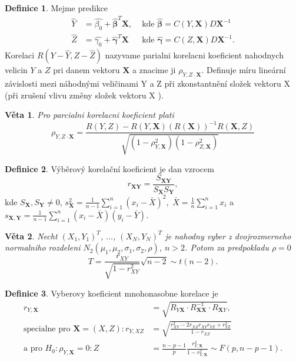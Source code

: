 \documentclass[a4]{report}
\newtheorem{theorem}{Věta}
\theoremstyle{definition}
\newtheorem{definition}{Definice}[section]
\begin{document}
{\begin{definition}
Mejme predikce
\begin{align*}
\hat{Y} &= \hat{\beta_0} + \bm{\hat{\beta}}^T \mathbf{X}, & \text{ kde } \bm{\hat{\beta}} =  C(Y, \mathbf{X}) D \mathbf{X}^{-1}\\
\hat{Z} &= \hat{\gamma_0} + \bm{\hat{\gamma}}^T \mathbf{X} & \text{ kde } \bm{\hat{\gamma}} =  C(Z, \mathbf{X}) D \mathbf{X}^{-1}.
\end{align*}
Korelaci $R(Y - \hat{Y}, Z - \hat{Z})$ nazyvame parialni korelacni koeficient nahodnych velicin $Y$ a $Z$ pri danem vektoru $\mathbf{X}$ a znacime ji $\rho_{Y, Z \cdot \mathbf{X}}$. Definuje míru lineární závislosti mezi náhodnými veličinami Y a Z při zkonstantnění složek vektoru X (při zrušení vlivu změny složek vektoru X ).
\end{definition} 

\begin{theorem}
Pro parcialni korelacni koeficient plati
\begin{equation*}
\rho_{Y, Z \cdot \mathbf{X}} = \frac{R(Y, Z) - R(Y, \mathbf{X}) (R(\mathbf{X}))^{-1} R(\mathbf{X}, Z)}{\sqrt{(1 - \rho_{Y, \mathbf{X}}^2)(1 - \rho_{Z, \mathbf{X}}^2)}}
\end{equation*}
\end{theorem}

\begin{definition}
Výběrový korelační koeficient je dan vzrocem
$$r _{\pmb{X} \pmb{Y}} = \frac{S_{\pmb{X} \pmb{Y}}}{S_{\mathbf{X}} S_{\mathbf{Y}}},$$ kde $S_{\mathbf{X}}, S_{\mathbf{Y}} \neq 0$, $s_{\pmb{X}}^2 = \frac{1}{n-1} \sum_{i=1}^{n} \left(x_i - \bar{X} \right)^2,$ $\bar{X} = \frac{1}{n} \sum_{i=1}^{n} x_i$ a $s_{\pmb{X},\pmb{Y}} = \frac{1}{n-1} \sum_{i=1}^{n} \left(x_i - \bar{X} \right)\left(y_i - \bar{Y} \right)$.
\end{definition}

\begin{theorem}
Necht $(X_1, Y_1)^T$, $\ldots$, $(X_N, Y_N)^T$ je nahodny vyber z dvojrozmerneho normalniho rozdeleni $N_2 (\mu_1, \mu_2, \sigma_1, \sigma_2, \rho)$, $n >2$. Potom za predpokladu $\rho = 0$ 
\begin{equation*}
T = \frac{r_{X Y}}{\sqrt{1 - r_{XY}^2}} \sqrt{n - 2} \sim t(n - 2).
\end{equation*}
\end{theorem}

\begin{definition}
Vyberovy koeficient mnohonasobne korelace je
\begin{align*}
r_{Y, \mathbf{X}} &= \sqrt{R_{Y \mathbf{X}} \cdot R_{\mathbf{X} \mathbf{X}}^{-1} \cdot R_{\mathbf{X} Y}},\\
\text{specialne pro } \mathbf{X}=(X,Z): r_{Y, XZ} &= \sqrt{\frac{r_{XY}^2 - 2 r_{XZ} r_{XY} r_{YZ} + r_{YZ}^2}{1 - r_{XZ}}} \\
\text{a pro } H_0: \rho_{Y, \mathbf{X}} = 0: Z &= \frac{n - p - 1}{p} \frac{r_{Y, \mathbf{X}}^2}{1 - r_{Y, \mathbf{X}}^2} \sim F(p, n - p - 1).
\end{align*}


\end{definition}}
\end{document}
